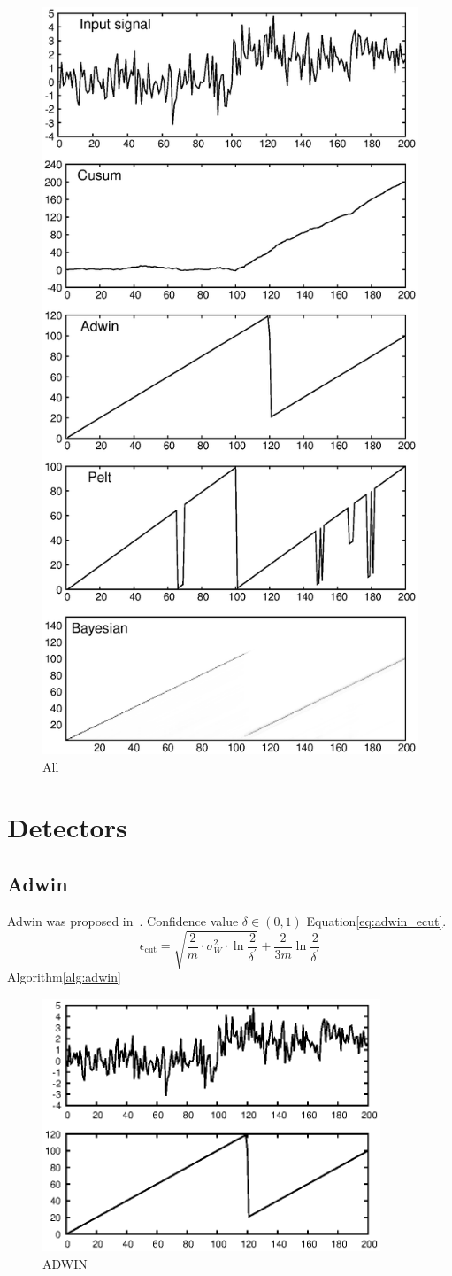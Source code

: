 \documentclass[doctoral,utf8,lot,loar,lof,shortloft,index]{jydiss}
\begin{document}
\begin{figure}[!htb]
	\centering
	\includegraphics[height=0.9\textwidth]{images/detectors_output_stats}
	\caption{All}\label{fig:all_detectors_stats}
\end{figure}

\section{Detectors}
\subsection{Adwin}
Adwin was proposed in~\cite{bifet2007learning}.
Confidence value $\delta \in (0,1)$
Equation\ref{eq:adwin_ecut}.
\begin{equation}\label{eq:adwin_ecut}
	\epsilon_{\text{cut}} = \sqrt{\frac{2}{m} \cdot \sigma_W^2 \cdot \ln{\frac{2}{\delta^\prime}}} + \frac{2}{3m} \ln{\frac{2}{\delta^\prime}}
\end{equation}
Algorithm\ref{alg:adwin}

\begin{figure}[!htb]
	\centering
	\includegraphics[width=0.9\textwidth]{images/example_output_adwin.eps}
	\caption{ADWIN}\label{fig:adwin_output_example}
\end{figure}
\end{document}
